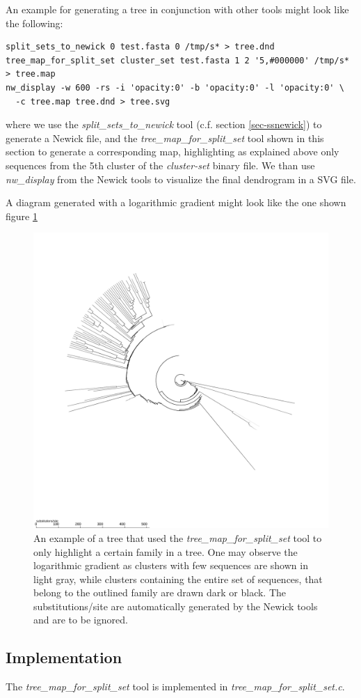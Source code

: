 An example for generating a tree in conjunction with other tools might
look like the following:
\begin{lstlisting}
split_sets_to_newick 0 test.fasta 0 /tmp/s* > tree.dnd
tree_map_for_split_set cluster_set test.fasta 1 2 '5,#000000' /tmp/s* > tree.map
nw_display -w 600 -rs -i 'opacity:0' -b 'opacity:0' -l 'opacity:0' \
  -c tree.map tree.dnd > tree.svg
\end{lstlisting}
where we use the \emph{split\_sets\_to\_newick} tool (c.f. section
\ref{sec-ssnewick}) to generate a
Newick file, and the \emph{tree\_map\_for\_split\_set} tool shown in
this section to generate a corresponding map, highlighting as
explained above only sequences from the 5th cluster of the
\emph{cluster-set} binary file. We than use \emph{nw\_display} from
the Newick tools \cite{newick_tools} to visualize the final dendrogram in
a SVG file.

A diagram generated with a logarithmic gradient might look like the one
shown figure \ref{fig-treemapset}

\begin{figure}
  \includegraphics[scale=0.6]{tree-clust.pdf}
  \caption{An example of a tree that used the
    \emph{tree\_map\_for\_split\_set} tool to only highlight a certain
    family in a tree. One may observe the logarithmic gradient as clusters
    with few sequences are shown in light gray, while clusters
    containing the entire set of sequences, that belong to the
    outlined family are drawn dark or black. The substitutions/site are
    automatically generated by the Newick tools
    \cite{newick_tools} and are to be ignored.}
  \label{fig-treemapset}
\end{figure}

\subsection{Implementation}
The \emph{tree\_map\_for\_split\_set} tool is implemented in \newline
\emph{tree\_map\_for\_split\_set.c}.



        
